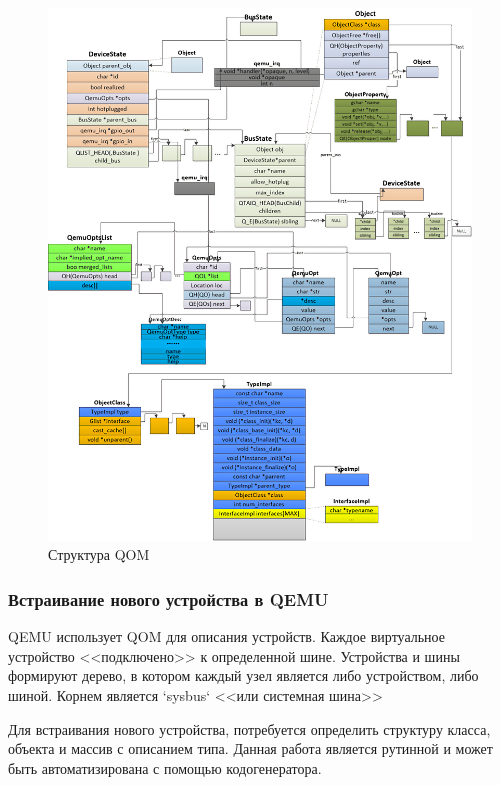 \begin{figure}[!htbp]
    \centering
    \begin{adjustbox}{max totalsize={\textwidth}{\textheight}}
        \includegraphics[]{images/qom-hierarchy_upscaled.png}
    \end{adjustbox}
    \caption{Структура QOM}\label{fig:qom-structure}
\end{figure}


\subsubsection{Встраивание нового устройства в QEMU}\label{sec:ch1/sec4/sub3/sub4}

QEMU использует QOM для описания устройств. Каждое виртуальное устройство <<подключено>> к определенной
шине. Устройства и шины формируют дерево, в котором каждый узел является либо устройством, либо
шиной. Корнем является `sysbus` <<или системная шина>>

Для встраивания нового устройства, потребуется определить структуру класса, объекта и массив с описанием
типа. Данная работа является рутинной и может быть автоматизирована с помощью кодогенератора.

